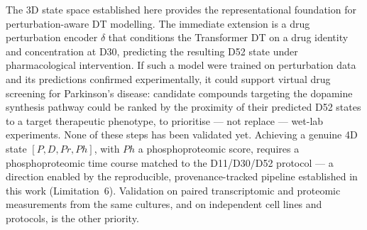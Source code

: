 \documentclass[5p,times,twocolumn]{elsarticle}
\newcommand{\rtag}[1]{}
\newcommand{\rev}[2]{\rtag{#1}#2}
\newcommand{\lang}[1]{#1}
\begin{document}
The 3D state space established here provides the representational
foundation for perturbation-aware DT modelling.
The immediate extension is a drug perturbation encoder $\delta$
that conditions the Transformer DT on a drug identity and
concentration at D30, predicting the resulting D52 state under
pharmacological intervention.
\rev{R2.20}{If such a model were trained on perturbation data
  and its predictions confirmed experimentally, it could support}
virtual drug screening for Parkinson's
disease: candidate compounds targeting the dopamine synthesis
pathway could be ranked by the proximity of their predicted D52
states to a target therapeutic phenotype\rev{R2.20}{, to
  prioritise --- not replace --- wet-lab experiments. None of
  these steps has been validated yet}.
Achieving a genuine 4D state $[P, D, Pr, Ph]$\lang{, with $Ph$ a
  phosphoproteomic score,} requires a
phosphoproteomic time course matched to the D11/D30/D52
protocol --- a direction enabled by the reproducible,
provenance-tracked pipeline established in this work
\rev{R1.12}{(Limitation~6)}.
\rev{R2.17,R2.19}{Validation on paired transcriptomic and
  proteomic measurements from the same cultures, and on
  independent cell lines and protocols, is the other priority.}

\end{document}
